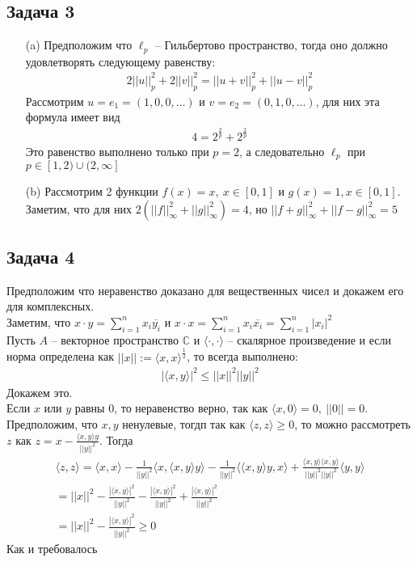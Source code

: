 \subsection*{Задача 3}
\begin{enumerate}
\item[(a)]
	Предположим что $\ell_p$ -- Гильбертово пространство, тогда оно должно удовлетворять следующему равенству:
	\begin{gather*}
		2||u||^2_p + 2||v||^2_p = ||u+v||^2_p + ||u-v||^2_p
	\end{gather*}
	Рассмотрим $u = e_1 = (1,0,0,\ldots )$ и $v = e_2 = (0,1,0,\ldots)$, для них эта формула имеет вид
	\begin{gather*}
		4 = 2^{\frac{2}{p}} + 2^{\frac{2}{p}}
	\end{gather*}
	Это равенство выполнено только при $p = 2$, а следовательно $\ell_p$ при $p \in [1,2) \cup (2, \infty]$
\item[(b)]
	Рассмотрим 2 функции $f(x) = x,\ x \in [0,1]$ и $g(x) = 1, x \in [0,1]$. Заметим, что для них $2(||f||_{\infty}^2 + ||g||_{\infty}^2) = 4$, но $||f + g||_{\infty}^2 + ||f - g||_{\infty}^2 = 5$	
\end{enumerate}
\vskip 0.4in

\subsection*{Задача 4}
	Предположим что неравенство доказано для вещественных чисел и докажем его для комплексных.\\
	Заметим, что $x \cdot y = \sum\limits_{i = 1}^{n} x_i \overline{y_i}$ и $x \cdot x = \sum\limits_{i = 1}^{n} x_i \overline{x_i} = \sum\limits_{i = 1}^{n} |x_i|^{2}$\\
	Пусть $A$ -- векторное пространство $\mathbb{C}$ и $\langle \cdot, \cdot \rangle$ -- скалярное произведение и если норма определена как $||x|| := \langle x, x \rangle^{\frac{1}{2}}$, то всегда выполнено: 
	\begin{gather*}
		|\langle x, y \rangle|^2 \leqslant ||x||^2||y||^2 
	\end{gather*}
	Докажем это.\\
	Если $x$ или $y$ равны $0$, то неравенство верно, так как $\langle x, 0 \rangle = 0,\ ||0|| = 0$. Предположим, что $x,y$ ненулевые, тогдп так как $\langle z, z \rangle \geqslant 0$, то можно рассмотреть $z$ как $z = x - \frac{\langle x,y \rangle y}{||y||^2}$. Тогда
	\begin{gather*}
		\langle z,z \rangle 
		= \langle x,x \rangle - \frac{1}{||y||^2} \langle x,\langle x,y \rangle y \rangle - \frac{1}{||y||^2}\langle \langle x,y \rangle y,x \rangle + \frac{\langle x,y \rangle \overline{\langle x,y \rangle}}{||y||^2 ||y||^2} \langle y,y \rangle\\
		= ||x||^2 - \frac{|\langle x,y \rangle|^2}{||y||^2} - \frac{|\langle x,y \rangle|^2}{||y||^2} + \frac{|\langle x,y \rangle|^2}{||y||^2}\\
		= ||x||^2 - \frac{|\langle x,y \rangle|^2}{||y||^2} \geqslant 0
	\end{gather*}
	Как и требовалось
\vskip 0.4in

